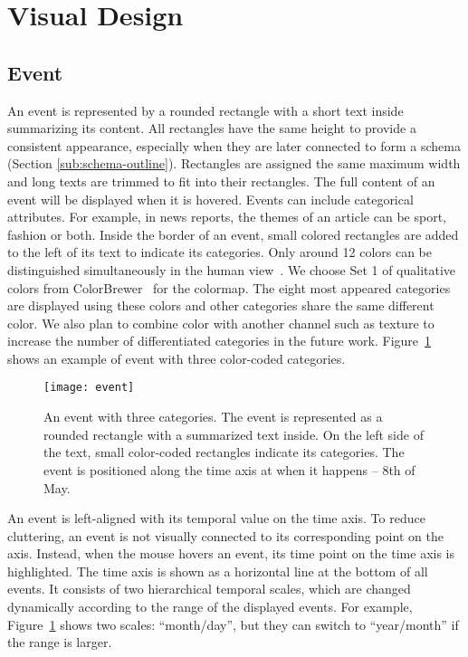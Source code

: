 \section{Visual Design}
\label{sec:interface}

\subsection{Event}
An event is represented by a rounded rectangle with a short text inside summarizing its content. All rectangles have the same height to provide a consistent appearance, especially when they are later connected to form a schema (Section \ref{sub:schema-outline}). Rectangles are assigned the same maximum width and long texts are trimmed to fit into their rectangles. The full content of an event will be displayed when it is hovered. Events can include categorical attributes. For example, in news reports, the themes of an article can be sport, fashion or both. Inside the border of an event, small colored rectangles are added to the left of its text to indicate its categories. Only around 12 colors can be distinguished simultaneously in the human view~\cite{Munzner2014}. We choose Set 1 of qualitative colors from ColorBrewer~\cite{Harrower2003} for the colormap. The eight most appeared categories are displayed using these colors and other categories share the same different color. We also plan to combine color with another channel such as texture to increase the number of differentiated categories in the future work. Figure~\ref{fig:event} shows an example of event with three color-coded categories.

\begin{figure}[ht]
\centering
\texttt{[image: event]}
\caption{An event with three categories. The event is represented as a rounded rectangle with a summarized text inside. On the left side of the text, small color-coded rectangles indicate its categories. The event is positioned along the time axis at when it happens -- 8th of May.}
\label{fig:event}
\end{figure}

An event is left-aligned with its temporal value on the time axis. To reduce cluttering, an event is not visually connected to its corresponding point on the axis. Instead, when the mouse hovers an event, its time point on the time axis is highlighted. The time axis is shown as a horizontal line at the bottom of all events. It consists of two hierarchical temporal scales, which are changed dynamically according to the range of the displayed events. For example, Figure~\ref{fig:event} shows two scales: ``month/day'', but they can switch to ``year/month'' if the range is larger.

